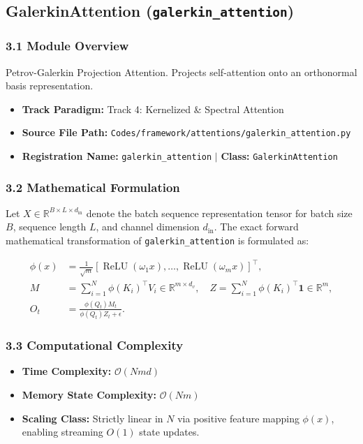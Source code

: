 \subsection{GalerkinAttention (\texttt{galerkin\_attention})}
\label{sec:app_module_galerkin\_attention}

\subsubsection*{3.1 Module Overview}
Petrov-Galerkin Projection Attention. Projects self-attention onto an orthonormal basis representation.
\begin{itemize}
    \item \textbf{Track Paradigm:} Track 4: Kernelized & Spectral Attention
    \item \textbf{Source File Path:} \texttt{Codes/framework/attentions/galerkin\_attention.py}
    \item \textbf{Registration Name:} \texttt{galerkin\_attention} $\mid$ \textbf{Class:} \texttt{GalerkinAttention}
\end{itemize}

\subsubsection*{3.2 Mathematical Formulation}
Let $X \in \mathbb{R}^{B \times L \times d_{\text{in}}}$ denote the batch sequence representation tensor for batch size $B$, sequence length $L$, and channel dimension $d_{\text{in}}$. The exact forward mathematical transformation of \texttt{galerkin\_attention} is formulated as:

\begin{align}
\phi(x) &= \frac{1}{\sqrt{m}} \left[ \operatorname{ReLU}(\omega_1 x), \dots, \operatorname{ReLU}(\omega_m x) \right]^\top, \\
M &= \sum_{i=1}^N \phi(K_i)^\top V_i \in \mathbb{R}^{m \times d_v}, \quad Z = \sum_{i=1}^N \phi(K_i)^\top \mathbf{1} \in \mathbb{R}^m, \\
O_t &= \frac{\phi(Q_t) M_t}{\phi(Q_t) Z_t + \epsilon}.
\end{align}


\subsubsection*{3.3 Computational Complexity}
\begin{itemize}
    \item \textbf{Time Complexity:} $\mathcal{O}(N m d)$
    \item \textbf{Memory State Complexity:} $\mathcal{O}(N m)$
    \item \textbf{Scaling Class:} Strictly linear in $N$ via positive feature mapping $\phi(x)$, enabling streaming $O(1)$ state updates.
\end{itemize}

